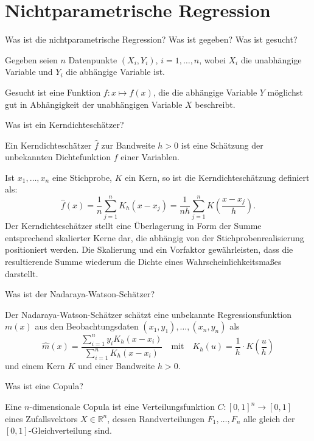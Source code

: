 \newpage
\section*{Nichtparametrische Regression}

\begin{QandA}
    \item Was ist die nichtparametrische Regression? Was ist gegeben? Was ist gesucht?
    \begin{answered}
        Gegeben seien $n$ Datenpunkte $(X_i, Y_i)$, $i = 1, \ldots, n$, wobei $X_i$ die unabhängige Variable und $Y_i$ die abhängige Variable ist.

        Gesucht ist eine Funktion $f: x \mapsto f(x)$, die die abhängige Variable $Y$ möglichst gut in Abhängigkeit der unabhängigen Variable $X$ beschreibt.
    \end{answered}

    \item Was ist ein Kerndichteschätzer?
    \begin{answered}
        Ein Kerndichteschätzer $\hat{f}$ zur Bandweite $h>0$ ist eine Schätzung der unbekannten Dichtefunktion $f$ einer Variablen.

        Ist $x_{1},\ldots ,x_{n}$ eine Stichprobe, $K$ ein Kern, so ist die Kerndichteschätzung definiert als:
        \[
            \hat{f}(x) = \frac{1}{n} \sum _{j=1}^{n}K_{h}(x-x_{j})={\frac{1}{nh}}\sum _{j=1}^{n}K\left({\frac{x-x_{j}}{h}}\right).
        \]
        Der Kerndichteschätzer stellt eine Überlagerung in Form der Summe entsprechend skalierter Kerne dar, die abhängig von der Stichprobenrealisierung positioniert werden.
        Die Skalierung und ein Vorfaktor gewährleisten, dass die resultierende Summe wiederum die Dichte eines Wahrscheinlichkeitsmaßes darstellt.
    \end{answered}

    \item Was ist der Nadaraya-Watson-Schätzer?
    \begin{answered}
        Der Nadaraya-Watson-Schätzer schätzt eine unbekannte Regressionsfunktion $m(x)$ aus den Beobachtungsdaten $(x_{1},y_{1}),\dots ,(x_{n},y_{n})$ als
        \[
            \hat{m}(x)={\frac{\sum _{i=1}^{n}y_{i}K_{h}(x-x_{i})}{\sum _{i=1}^{n}K_{h}(x-x_{i})}} \quad \text{mit} \quad K_{h}(u)=\frac{1}{h}\cdot K\left(\frac{u}{h}\right)
        \]
        und einem Kern $K$ und einer Bandweite $h>0$.
    \end{answered}

    \item Was ist eine Copula?
    \begin{answered}
        Eine $n$-dimensionale Copula ist eine Verteilungsfunktion $C: [0, 1]^n \to [0, 1]$ eines Zufallsvektors $X \in \mathbb{R}^n$, dessen Randverteilungen $F_1, \ldots, F_n$ alle gleich der $[0, 1]$-Gleichverteilung sind.
    \end{answered}


\end{QandA}
